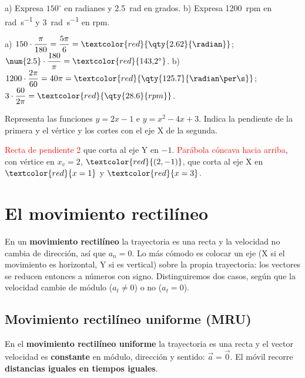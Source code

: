 \begin{exercise}
    a) Expresa \(150^\circ\) en radianes y \qty{2.5}{\radian} en grados. b) Expresa \qty{1200}{rpm} en \unit{\radian\per\s} y
    \qty{3}{\radian\per\s} en rpm.
    \begin{solu}
        a) \(150 \cdot \dfrac{\pi}{180} = \dfrac{5\pi}{6} = \textcolor{red}{\qty{2.62}{\radian}}\); \(\num{2.5} \cdot \dfrac{180}{\pi} =
        \textcolor{red}{143{,}2^\circ}\). b) \(1200 \cdot \dfrac{2\pi}{60} = 40\pi = \textcolor{red}{\qty{125.7}{\radian\per\s}}\);
        \(3 \cdot \dfrac{60}{2\pi} = \textcolor{red}{\qty{28.6}{rpm}}\).
    \end{solu}
\end{exercise}

\begin{exercise}
    Representa las funciones \(y = 2x - 1\) e \(y = x^2 - 4x + 3\). Indica la pendiente de la primera y el vértice y los cortes
    con el eje X de la segunda.
    \begin{solu}
        \textcolor{red}{Recta de pendiente 2} que corta al eje Y en \(-1\). \textcolor{red}{Parábola cóncava hacia arriba}, con vértice
        en \(x_v = 2\), \(\textcolor{red}{(2, -1)}\), que corta al eje X en \(\textcolor{red}{x = 1}\) y \(\textcolor{red}{x = 3}\).
    \end{solu}
\end{exercise}

\section{El movimiento rectilíneo}\label{sec:ud9-rectilineo}

En un \textbf{movimiento rectilíneo} la trayectoria es una recta y la velocidad no cambia de dirección, así que \(a_n = 0\). Lo más
cómodo es colocar un eje (X si el movimiento es horizontal, Y si es vertical) sobre la propia trayectoria: los vectores se reducen
entonces a números con signo. Distinguiremos dos casos, según que la velocidad cambie de módulo (\(a_t \neq 0\)) o no (\(a_t = 0\)).

\subsection{Movimiento rectilíneo uniforme (MRU)}

\begin{definition}[MRU]
    En el \textbf{movimiento rectilíneo uniforme} la trayectoria es una recta y el vector velocidad es \textbf{constante} en módulo,
    dirección y sentido: \(\vec a = \vec 0\). El móvil recorre \textbf{distancias iguales en tiempos iguales}.
\end{definition}

